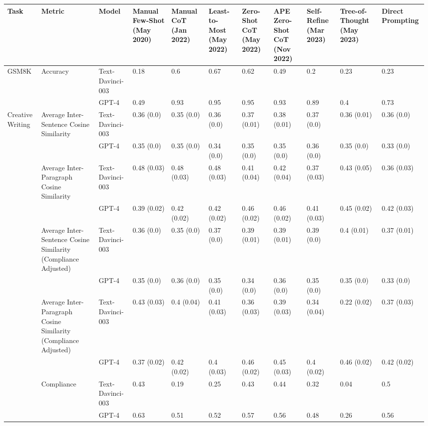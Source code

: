 \begin{tabular}{p{0.75cm}|p{1.5cm}|p{0.75cm}|p{0.75cm}|p{0.75cm}|p{0.75cm}|p{0.75cm}|p{0.75cm}|p{0.75cm}|p{0.75cm}|p{0.75cm}}
\toprule
Task & Metric & Model & Manual Few-Shot (May 2020) & Manual CoT (Jan 2022) & Least-to-Most (May 2022) & Zero-Shot CoT (May 2022) & APE Zero-Shot CoT (Nov 2022) & Self-Refine (Mar 2023) & Tree-of-Thought (May 2023) & Direct Prompting \\
\hline
\midrule
GSM8K & Accuracy & Text-Davinci-003 & 0.18 & 0.6 & 0.67 & 0.62 & 0.49 & 0.2 & 0.23 & 0.23 \\
\hline
 &  & GPT-4 & 0.49 & 0.93 & 0.95 & 0.95 & 0.93 & 0.89 & 0.4 & 0.73 \\
\hline
Creative Writing & Average Inter-Sentence Cosine Similarity & Text-Davinci-003 & 0.36 (0.0) & 0.35 (0.0) & 0.36 (0.0) & 0.37 (0.01) & 0.38 (0.01) & 0.37 (0.0) & 0.36 (0.01) & 0.36 (0.0) \\
\hline
 &  & GPT-4 & 0.35 (0.0) & 0.35 (0.0) & 0.34 (0.0) & 0.35 (0.0) & 0.35 (0.0) & 0.36 (0.0) & 0.35 (0.0) & 0.33 (0.0) \\
\hline
 & Average Inter-Paragraph Cosine Similarity & Text-Davinci-003 & 0.48 (0.03) & 0.48 (0.03) & 0.48 (0.03) & 0.41 (0.04) & 0.42 (0.04) & 0.37 (0.03) & 0.43 (0.05) & 0.36 (0.03) \\
\hline
 &  & GPT-4 & 0.39 (0.02) & 0.42 (0.02) & 0.42 (0.02) & 0.46 (0.02) & 0.46 (0.02) & 0.41 (0.03) & 0.45 (0.02) & 0.42 (0.03) \\
\hline
 & Average Inter-Sentence Cosine Similarity (Compliance Adjusted) & Text-Davinci-003 & 0.36 (0.0) & 0.35 (0.0) & 0.37 (0.0) & 0.39 (0.01) & 0.39 (0.01) & 0.39 (0.0) & 0.4 (0.01) & 0.37 (0.01) \\
\hline
 &  & GPT-4 & 0.35 (0.0) & 0.36 (0.0) & 0.35 (0.0) & 0.34 (0.0) & 0.36 (0.0) & 0.35 (0.0) & 0.35 (0.0) & 0.33 (0.0) \\
\hline
 & Average Inter-Paragraph Cosine Similarity (Compliance Adjusted) & Text-Davinci-003 & 0.43 (0.03) & 0.4 (0.04) & 0.41 (0.03) & 0.36 (0.03) & 0.39 (0.03) & 0.34 (0.04) & 0.22 (0.02) & 0.37 (0.03) \\
\hline
 &  & GPT-4 & 0.37 (0.02) & 0.42 (0.02) & 0.4 (0.03) & 0.46 (0.02) & 0.45 (0.03) & 0.4 (0.02) & 0.46 (0.02) & 0.42 (0.02) \\
\hline
 & Compliance & Text-Davinci-003 & 0.43 & 0.19 & 0.25 & 0.43 & 0.44 & 0.32 & 0.04 & 0.5 \\
\hline
 &  & GPT-4 & 0.63 & 0.51 & 0.52 & 0.57 & 0.56 & 0.48 & 0.26 & 0.56 \\
\hline
\bottomrule
\end{tabular}
